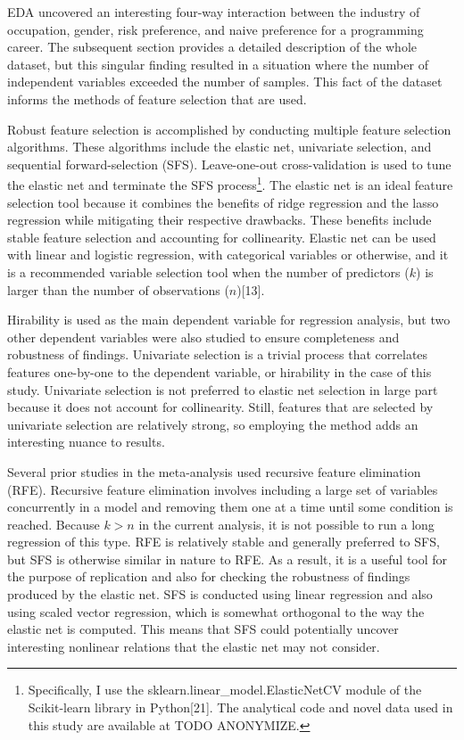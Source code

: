 \documentclass[review]{elsarticle}
\begin{document}
EDA uncovered an interesting four-way interaction between
the industry of occupation, gender, risk preference, and naive preference for a programming career.
The subsequent section provides a detailed description of the whole dataset,
but this singular finding resulted in a situation where the number of independent variables exceeded the number of samples.
This fact of the dataset informs the methods of feature selection that are used.

Robust feature selection is accomplished by conducting multiple feature selection algorithms.
These algorithms include the elastic net, univariate selection, and sequential forward-selection (SFS).
Leave-one-out cross-validation is used to tune the elastic net and terminate the SFS process\footnote{
    Specifically, I use the sklearn.linear_model.ElasticNetCV module of the Scikit-learn library in Python[21].
    The analytical code and novel data used in this study are available at TODO ANONYMIZE.
}.
The elastic net is an ideal feature selection tool because it combines the benefits of ridge regression and the lasso regression
while mitigating their respective drawbacks.
These benefits include stable feature selection and accounting for collinearity.
Elastic net can be used with linear and logistic regression, with categorical variables or otherwise,
and it is a recommended variable selection tool
when the number of predictors ($k$) is larger than the number of observations ($n$)[13].

Hirability is used as the main dependent variable for regression analysis,
but two other dependent variables were also studied to ensure completeness and robustness of findings.
Univariate selection is a trivial process that correlates features one-by-one to the dependent variable,
or hirability in the case of this study.
Univariate selection is not preferred to elastic net selection in large part because it does not account for collinearity.
Still, features that are selected by univariate selection are relatively strong, so employing the method adds an interesting nuance to results.

Several prior studies in the meta-analysis used recursive feature elimination (RFE).
Recursive feature elimination involves including a large set of variables concurrently in a model and removing them one at a time
until some condition is reached.
Because $k > n$ in the current analysis, it is not possible to run a long regression of this type.
RFE is relatively stable and generally preferred to SFS, but SFS is otherwise similar in nature to RFE.
As a result, it is a useful tool for the purpose of replication and also for checking the robustness of findings produced by the elastic net.
SFS is conducted using linear regression and also using scaled vector regression, which is somewhat orthogonal to the way the elastic net is computed.
This means that SFS could potentially uncover interesting nonlinear relations that the elastic net may not consider.
\end{document}
